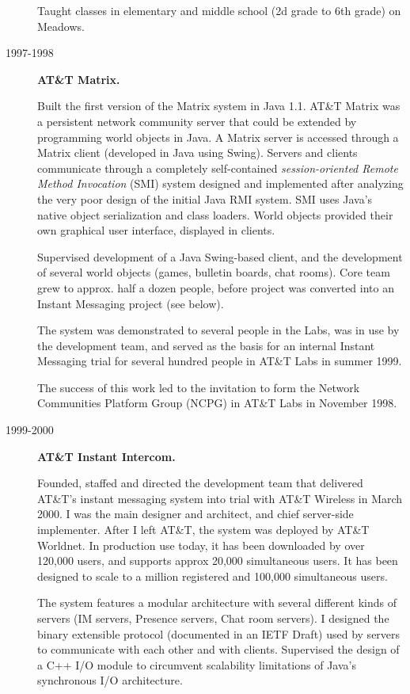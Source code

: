 \documentclass{article}
\begin{document}
\begin{description}
 Taught classes in elementary and middle school (2d grade to 6th
 grade) on Meadows.

\item[1997-1998]   {\bf AT\&T Matrix.}

  Built the first version of the Matrix system in
  Java 1.1.  AT\&T Matrix was a persistent network community server that
  could be extended by programming world objects in Java.  A Matrix
  server is accessed through a Matrix client (developed in Java using
  Swing).  Servers and clients communicate through a completely
  self-contained {\em session-oriented Remote Method Invocation} (SMI)
  system designed and implemented after analyzing the very poor design
  of the initial Java RMI system.  SMI uses Java's native object
  serialization and class loaders.  World objects provided their own
  graphical user interface, displayed in clients.

  Supervised development of a Java Swing-based client, and the
  development of several world objects (games, bulletin boards, chat
  rooms).  Core team grew to approx. half a dozen people, before
  project was converted into an Instant Messaging project (see below).

  The system was demonstrated to several people in the Labs, was in
  use by the development team, and served as the basis for an internal
  Instant Messaging trial for several hundred people in AT\&T Labs in
  summer 1999.

  The success of this work led to the invitation to form the Network
  Communities Platform Group (NCPG) in AT\&T Labs in November 1998.

\item[1999-2000] {\bf AT\&T Instant Intercom.} 

  Founded, staffed and directed the development team that delivered
  AT\&T's instant messaging system into trial with AT\&T Wireless in
  March 2000. I was the main designer and architect, and chief
  server-side implementer. After I left AT\&T, the system was deployed
  by AT\&T Worldnet. In production use today, it has been downloaded
  by over 120,000 users, and supports approx 20,000 simultaneous
  users. It has been designed to scale to a million registered and
  100,000 simultaneous users.

  The system features a modular architecture with several different
  kinds of servers (IM servers, Presence servers, Chat room
  servers). I designed the binary extensible protocol (documented in
  an IETF Draft) used by servers to communicate with each other and
  with clients. Supervised the design of a C++ I/O module to
  circumvent scalability limitations of Java's synchronous I/O
  architecture.


\end{description}
\end{document}
